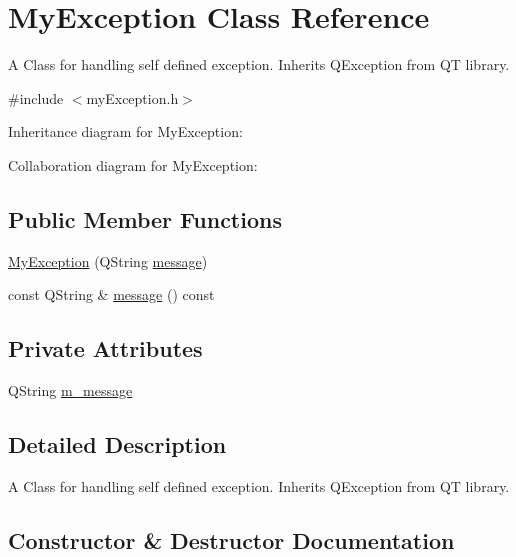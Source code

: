 \hypertarget{class_my_exception}{}\section{My\+Exception Class Reference}
\label{class_my_exception}


A Class for handling self defined exception. Inherits Q\+Exception from Q\+T library.  




{\ttfamily \#include $<$my\+Exception.\+h$>$}



Inheritance diagram for My\+Exception\+:


Collaboration diagram for My\+Exception\+:
\subsection*{Public Member Functions}
\begin{DoxyCompactItemize}
\item 
\hyperlink{class_my_exception_ae33f548baf0186a9ba69d7064eaed0fd}{My\+Exception} (Q\+String \hyperlink{class_my_exception_a7371232a66d68dcd8c8c6363b434c0db}{message})
\item 
const Q\+String \& \hyperlink{class_my_exception_a7371232a66d68dcd8c8c6363b434c0db}{message} () const 
\end{DoxyCompactItemize}
\subsection*{Private Attributes}
\begin{DoxyCompactItemize}
\item 
Q\+String \hyperlink{class_my_exception_a999022cac2ca013b5663095a77f0220f}{m\+\_\+message}
\end{DoxyCompactItemize}


\subsection{Detailed Description}
A Class for handling self defined exception. Inherits Q\+Exception from Q\+T library. 

\subsection{Constructor \& Destructor Documentation}
\hypertarget{class_my_exception_ae33f548baf0186a9ba69d7064eaed0fd}{}
